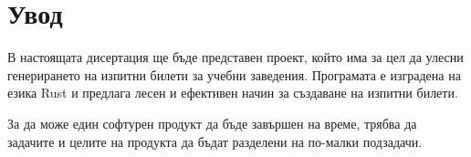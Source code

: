 \section{Увод}

В настоящата дисертация ще бъде представен проект, който има за цел да улесни
генерирането на изпитни билети за учебни заведения. Програмата е изградена на
езика Rust и предлага лесен и ефективен начин за създаване на изпитни билети.

За да може един софтурен продукт да бъде завършен на време, трябва да задачите
и целите на продукта да бъдат разделени на по-малки подзадачи.

